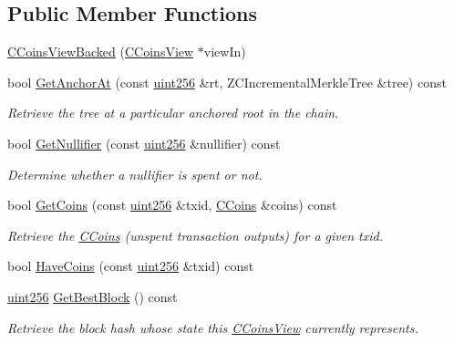 \subsection*{Public Member Functions}
\begin{DoxyCompactItemize}
\item 
\mbox{\hyperlink{class_c_coins_view_backed_af86a3b07433e8d84678772411791125e}{C\+Coins\+View\+Backed}} (\mbox{\hyperlink{class_c_coins_view}{C\+Coins\+View}} $\ast$view\+In)
\item 
bool \mbox{\hyperlink{class_c_coins_view_backed_a85e573aed0a7e713dc5d6a0478649435}{Get\+Anchor\+At}} (const \mbox{\hyperlink{classuint256}{uint256}} \&rt, Z\+C\+Incremental\+Merkle\+Tree \&tree) const
\begin{DoxyCompactList}\small\item\em Retrieve the tree at a particular anchored root in the chain. \end{DoxyCompactList}\item 
bool \mbox{\hyperlink{class_c_coins_view_backed_afbfee79b18b475d67cd757a7dc4f5955}{Get\+Nullifier}} (const \mbox{\hyperlink{classuint256}{uint256}} \&nullifier) const
\begin{DoxyCompactList}\small\item\em Determine whether a nullifier is spent or not. \end{DoxyCompactList}\item 
bool \mbox{\hyperlink{class_c_coins_view_backed_a456f9e85817556329a959c120998df5b}{Get\+Coins}} (const \mbox{\hyperlink{classuint256}{uint256}} \&txid, \mbox{\hyperlink{class_c_coins}{C\+Coins}} \&coins) const
\begin{DoxyCompactList}\small\item\em Retrieve the \mbox{\hyperlink{class_c_coins}{C\+Coins}} (unspent transaction outputs) for a given txid. \end{DoxyCompactList}\item 
bool \mbox{\hyperlink{class_c_coins_view_backed_ad49041658bdec807d556e080476e6543}{Have\+Coins}} (const \mbox{\hyperlink{classuint256}{uint256}} \&txid) const
\item 
\mbox{\hyperlink{classuint256}{uint256}} \mbox{\hyperlink{class_c_coins_view_backed_a39bca41ae922d0ce7f40e8aeab289280}{Get\+Best\+Block}} () const
\begin{DoxyCompactList}\small\item\em Retrieve the block hash whose state this \mbox{\hyperlink{class_c_coins_view}{C\+Coins\+View}} currently represents. \end{DoxyCompactList}\item 

\end{DoxyCompactItemize}
